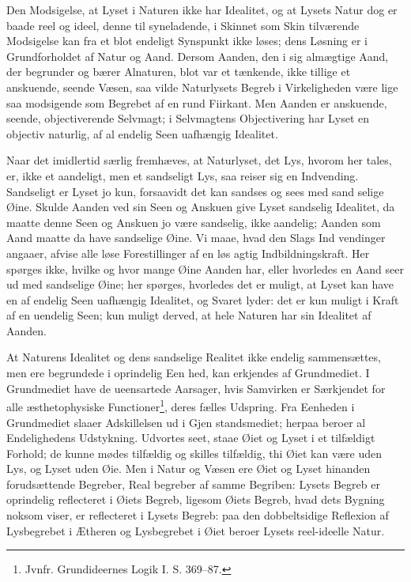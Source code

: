 \documentclass[12pt,a4paper]{book}
\begin{document}
Den Modsigelse, at Lyset i Naturen ikke har Idealitet, og at Lysets
Natur dog er baade reel og ideel, denne til\-%
syneladende, i Skinnet som Skin tilværende Modsigelse kan fra et blot
endeligt Synspunkt ikke løses; dens Løsning er i Grundforholdet af
Natur og Aand. Dersom Aanden, den i sig almægtige Aand, der begrunder
og bærer Alnaturen, blot var et tænkende, ikke tillige et anskuende,
seende Væsen, saa vilde Naturlysets Begreb i Virkeligheden være lige
saa modsigende som Begrebet af en rund Fiirkant. Men Aanden er
anskuende, seende, objectiverende Selvmagt; i Selvmagtens Objectivering
har Lyset en objectiv naturlig, af al endelig Seen uafhængig Idealitet.

Naar det imidlertid særlig fremhæves, at Naturlyset, det Lys, hvorom
her tales, er, ikke et aandeligt, men et sandseligt Lys, saa reiser sig
en Indvending. Sandseligt er Lyset jo kun, forsaavidt det kan sandses
og sees med sand\-%
selige Øine. Skulde Aanden ved sin Seen og Anskuen give Lyset sandselig
Idealitet, da maatte denne Seen og Anskuen jo være sandselig, ikke
aandelig; Aanden som Aand maatte da have sandselige Øine. Vi maae, hvad
den Slags Ind\-%
vendinger angaaer, afvise alle løse Forestillinger af en løs\-%
agtig Indbildningskraft. Her spørges ikke, hvilke og hvor\-%
mange Øine Aanden har, eller hvorledes en Aand seer ud med sandselige
Øine; her spørges, hvorledes det er muligt,
at Lyset kan have en af endelig Seen uafhængig Idealitet, og Svaret
lyder: det er kun muligt i Kraft af en uendelig Seen; kun muligt
derved, at hele Naturen har sin Idealitet af Aanden.

At Naturens Idealitet og dens sandselige Realitet ikke endelig
sammensættes, men ere begrundede i oprindelig Een\-%
hed, kan erkjendes af Grundmediet. I Grundmediet have de ueensartede
Aarsager, hvis Samvirken er Særkjendet for alle æsthetophysiske
Functioner\footnote{Jvnfr. Grundideernes Logik I. S. 369--87.}, deres
fælles Udspring. Fra Eenheden i Grundmediet slaaer Adskillelsen ud i
Gjen\-%
standsmediet; herpaa beroer al Endelighedens Udstykning. Udvortes seet,
staae Øiet og Lyset i et tilfældigt Forhold; de kunne mødes tilfældig
og skilles tilfældig, thi Øiet kan være uden Lys, og Lyset uden Øie.
Men i Natur og Væsen ere Øiet og Lyset hinanden forudsættende
Begreber, Real\-%
begreber af samme Begriben: Lysets Begreb er oprindelig reflecteret i
Øiets Begreb, ligesom Øiets Begreb, hvad dets Bygning noksom viser, er
reflecteret i Lysets Begreb: paa den dobbeltsidige Reflexion af
Lysbegrebet i Ætheren og Lysbegrebet i Øiet beroer Lysets reel-ideelle
Natur.
\end{document}
